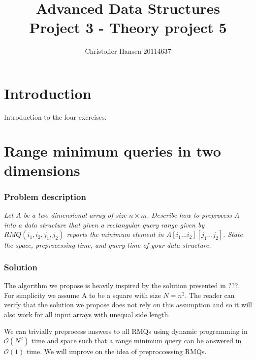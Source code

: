 \documentclass[a4paper,oneside,article,11pt]{memoir}
\title{Advanced Data Structures \\ Project 3 - Theory project 5}
\author{Christoffer Hansen 20114637}
\begin{document}
\begin{titlingpage}
\clearpage

\maketitle
\thispagestyle{empty}

\begin{abstract}

\end{abstract}
\end{titlingpage}

\pagebreak

\tableofcontents

\pagebreak

\chapter{Introduction}
Introduction to the four exercises.

\chapter{Range minimum queries in two dimensions}
\label{chp:rmq2d}
\subsection{Problem description}
\textit{Let $A$ be a two dimensional array of size $n \times m$. Describe how to preprocess $A$ into a data structure that given a rectangular query range given by $RMQ(i_1,i_2,j_1,j_2)$ reports the minimum element in $A\left[ i_1\dots i_2\right]\left[j_1\dots j_2\right]$. State the space, preprocessing time, and query time of your data structure.}

\subsection{Solution}
The algorithm we propose is heavily inspired by the solution presented in ???. For simplicity we assume A to be a square with size $N = n^2$. The reader can verify that the solution we propose does not rely on this assumption and so it will also work for all input arrays with unequal side length.

We can trivially preprocess answers to all RMQs using dynamic programming in $\mathcal{O}(N^2)$ time and space such that a range minimum query can be answered in $\mathcal{O}(1)$ time. We will improve on the idea of preproccessing RMQs.
\end{document}
